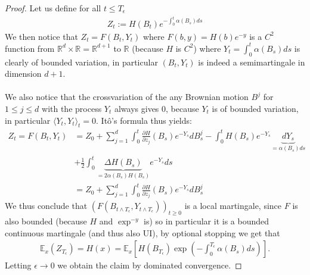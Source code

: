 \documentclass[../mainfile.tex]{subfiles}
\begin{document}
\begin{proof}
Let us define for all $t \leq T_\epsilon$
\begin{align*}
Z_t:= H(B_t)e^{-  \int_0^t \alpha (B_s)ds}
\end{align*}
We then notice that $Z_t=F(B_t,Y_t)$ where $F(b,y)=H(b)e^{-y}$ is a $C^2$ function from $\mathbb{R}^d \times \mathbb{R}= \mathbb{R}^{d+1}$ to $\mathbb{R}$ (because $H$ is $C^2$) where $Y_t= \int_0^t \alpha (B_s)ds$ is clearly of bounded variation, in particular $(B_t,Y_t)$ is indeed a semimartingale in dimension $d+1$. 
\\\\
We also notice that the crossvariation of the any Brownian motion $B^j$ for $1 \leq j \leq d$ with the process $Y_t$ always gives $0$, because $Y_t$ is of bounded variation, in particular $\langle Y_t,Y_t \rangle_t=0$. Itô's formula thus yields:
\begin{align*}
Z_t=F(B_t,Y_t)&= Z_0 + \sum_{j=1}^d \int_0^t \frac{\partial H}{\partial z_j}(B_s) e^{-Y_s} d B_s^j - \int_0^t H(B_s)e^{-Y_s} \underbrace{dY_s}_{= \alpha (B_s)ds} \\
& + \frac{1}{2} \int_0^t \underbrace{\Delta H(B_s)}_{= 2 \alpha(B_s)H(B_s)}e^{-Y_s}ds \\
&= Z_0 + \sum_{j=1}^d \int_0^t \frac{\partial H}{\partial z_j}(B_s) e^{-Y_s} d B_s^j
\end{align*} 
We thus conclude that $(F(B_{t \wedge T_\epsilon}, Y_{t \wedge T_\epsilon}))_{t \geq 0}$  is a local martingale, since $F$ is also bounded (because $H$ and $\exp^{-y}$ is) so in particular it is a bounded continuous martingale (and thus also UI), by optional stopping we get that 
\begin{align*}
\mathbb{E}_x(Z_{T_\epsilon})=H(x) = \mathbb{E}_x\left[ H(B_{T_\epsilon}) \exp \left(- \int_0^{T_\epsilon} \alpha (B_s)ds\right) \right].
\end{align*}
Letting $\epsilon \to 0$ we obtain the claim by dominated convergence. 
\end{proof}
\newpage
\end{document}
